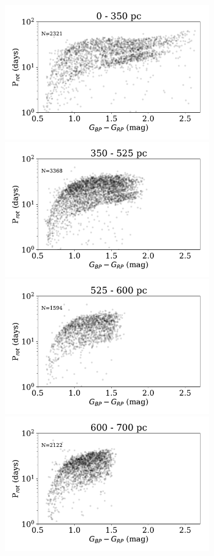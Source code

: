 \documentclass[trackchanges,preprint2]{aastex62}
\begin{document}
\begin{figure}[]
\centering
\includegraphics[width=3.5in]{fig2a}
\includegraphics[width=3.5in]{fig2b}
\includegraphics[width=3.5in]{fig2c}
\includegraphics[width=3.5in]{fig2d}

\end{figure}
\end{document}
